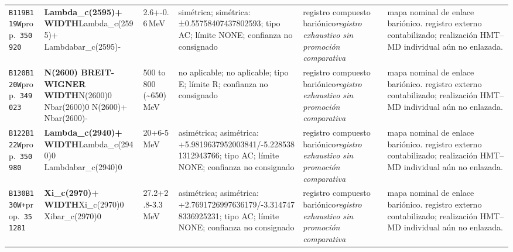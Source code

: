 \begin{landscape}
\begin{longtable}{L{1.85cm}L{4.45cm}L{2.35cm}L{4.05cm}L{3.35cm}L{7.15cm}}
\texttt{B119}\newline \texttt{B119W}\newline prop.\ \texttt{350920} & \textbf{Lambda\_\allowbreak{}c(2595)+ WIDTH}\newline Lambda\_\allowbreak{}c(2595)+ \textbar{}\allowbreak{} Lambdabar\_\allowbreak{}c(2595)- & 2.6+-0.6\,MeV & simétrica; simétrica: ±0.55758407437802593; tipo AC; límite NONE; confianza no consignado & registro compuesto bariónico\newline \emph{registro exhaustivo sin promoción comparativa} & mapa nominal de enlace bariónico. registro externo contabilizado; realización HMT--MD individual aún no enlazada. \\
\texttt{B120}\newline \texttt{B120W}\newline prop.\ \texttt{349023} & \textbf{N(2600) BREIT-WIGNER WIDTH}\newline N(2600)0 \textbar{}\allowbreak{} Nbar(2600)0 \textbar{}\allowbreak{} N(2600)+ \textbar{}\allowbreak{} Nbar(2600)- & 500 to 800 (\textasciitilde{}650)\,MeV & no aplicable; no aplicable; tipo E; límite R; confianza no consignado & registro compuesto bariónico\newline \emph{registro exhaustivo sin promoción comparativa} & mapa nominal de enlace bariónico. registro externo contabilizado; realización HMT--MD individual aún no enlazada. \\
\texttt{B122}\newline \texttt{B122W}\newline prop.\ \texttt{350980} & \textbf{Lambda\_\allowbreak{}c(2940)+ WIDTH}\newline Lambda\_\allowbreak{}c(2940)0 \textbar{}\allowbreak{} Lambdabar\_\allowbreak{}c(2940)0 & 20+6-5\,MeV & asimétrica; asimétrica: +5.9819637952003841/-5.2285381312943766; tipo AC; límite NONE; confianza no consignado & registro compuesto bariónico\newline \emph{registro exhaustivo sin promoción comparativa} & mapa nominal de enlace bariónico. registro externo contabilizado; realización HMT--MD individual aún no enlazada. \\
\texttt{B130}\newline \texttt{B130W+}\newline prop.\ \texttt{351281} & \textbf{Xi\_\allowbreak{}c(2970)+ WIDTH}\newline Xi\_\allowbreak{}c(2970)0 \textbar{}\allowbreak{} Xibar\_\allowbreak{}c(2970)0 & 27.2+2.8-3.3\,MeV & asimétrica; asimétrica: +2.7691726997636179/-3.3147478336925231; tipo AC; límite NONE; confianza no consignado & registro compuesto bariónico\newline \emph{registro exhaustivo sin promoción comparativa} & mapa nominal de enlace bariónico. registro externo contabilizado; realización HMT--MD individual aún no enlazada. \\

\end{longtable}
\end{landscape}
